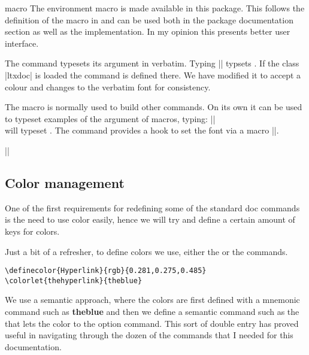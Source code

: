 \def\MacroFont{\ttfamily\color{thecs}}
\begin{environment}{macro} The environment macro is made available in this
package. This follows the definition of the macro in  and can be used both in
the package documentation section as well as the implementation. In my opinion this presents
 better user interface. 
\end{environment}



\begin{macro}{\cmd} The command \cmd{\cmd} typesets its argument in
  verbatim. Typing |\cmd{\cmd}| typsets \cmd{\cmd}. If the class
  |ltxdoc| is loaded the command is defined there. We have modified
  it to accept a colour and changes to the verbatim font 
  for consistency.
\end{macro}

\begin{macro}{\meta}
The macro  is normally used to build other commands. On its own it can be used to typeset
examples of the argument of macros, typing:
     || \\
 will typeset . The command provides a hook to set the font via a macro |\meta@font@select|. 
\end{macro}


|\def\meta@font@select{\upshape\color{black}}|


\subsection{Color management}
One of the first requirements for redefining some of the standard doc commands is the need to use color easily, hence we will try and define a certain amount of keys for colors.

Just a bit of a refresher, to define colors we use, either the  or the  commands.


\begin{verbatim}
\definecolor{Hyperlink}{rgb}{0.281,0.275,0.485}
\colorlet{thehyperlink}{theblue}
\end{verbatim}


We use a semantic approach, where the colors are first defined with a mnemonic command such as {\bfseries\textcolor{theblue}{theblue}} and then we define a semantic command such as the that lets the color to the option command. This sort of double entry has proved useful in navigating through the dozen of the commands that I needed for this documentation.


